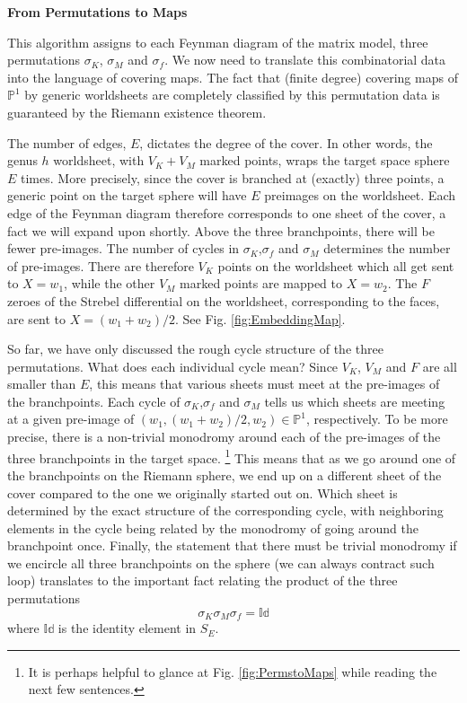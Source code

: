 \documentclass[english]{article}
\renewcommand{\>}{\rangle}
\newcommand{\<}{\langle}
\renewcommand{\(}{\left(}
\renewcommand{\)}{\right)}
\begin{document}
\noindent \textbf{From Permutations to Maps}

This algorithm assigns to each Feynman diagram of the matrix model, three permutations $\sigma_{K}$, $\sigma_{M}$ and $\sigma_{f}$. We now need to translate this combinatorial data into the language of covering maps. The fact that (finite degree) covering maps of  $\mathbb{P}^{1}$ by generic worldsheets are completely classified by this permutation data is guaranteed by the Riemann existence theorem\cite{Lando2003GraphsOS}. 

The number of edges, $E$, dictates the degree of the cover. In other words, the genus $h$ worldsheet, with $V_{K}+V_{M}$ marked points, wraps the target space sphere $E$ times. More precisely, since the cover is branched at (exactly) three points, a generic point on the target sphere will have $E$ preimages on the worldsheet. Each edge of the Feynman diagram therefore corresponds to one sheet of the cover, a fact we will expand upon shortly.
Above the three branchpoints, there will be fewer pre-images. The number of cycles in $\sigma_{K}$,$\sigma_{f}$ and $\sigma_{M}$ determines the number of pre-images. There are therefore $V_{K}$ points on the worldsheet which all get sent to  $X=w_1$, while the other $V_{M}$ marked points are mapped to $X=w_2$. The $F$ zeroes of the Strebel differential on the worldsheet, corresponding to the faces, are sent to $X=(w_1+w_2)/2$. See Fig. \ref{fig:EmbeddingMap}. 

So far, we have only discussed the rough cycle structure of the three permutations. What does each individual cycle mean? Since $V_{K}$, $V_{M}$ and $F$ are all smaller than $E$, this means that various sheets must meet at the pre-images of the branchpoints. Each cycle of $\sigma_{K}$,$\sigma_{f}$ and $\sigma_{M}$ tells us which sheets are meeting at a given pre-image of $(w_1,(w_1 + w_2)/2,w_2) \in \mathbb{P}^1$, respectively. To be more precise, there is a non-trivial monodromy around each of the pre-images of the three branchpoints in the target space. \footnote{It is perhaps helpful to glance at Fig. \ref{fig:PermstoMaps} while reading the next few sentences.} This means that as we go around one of the branchpoints on the Riemann sphere, we end up on a different sheet of the cover compared to the one we originally started out on. Which sheet is determined by the exact structure of the corresponding cycle, with neighboring elements in the cycle being related by the monodromy of going around the branchpoint once. Finally, the statement that there must be trivial monodromy if we encircle all three branchpoints on the sphere (we can always contract such loop) translates to the important fact relating the product of the three permutations
\begin{equation}
    \sigma_{K} \sigma_{M} \sigma_{f} = \mathbb{Id}
\end{equation}
where $\mathbb{Id}$ is the identity element in $S_{E}$.
\end{document}
